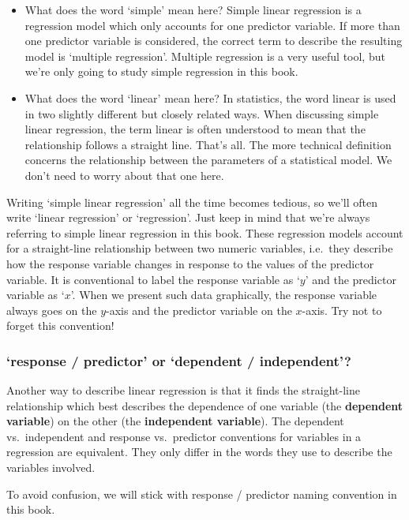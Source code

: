 \documentclass[
]{book}
\newenvironment{greybox}{
  \definecolor{shadecolor}{rgb}{0.95,0.95,0.95}  %
  \color{black}
  \begin{shaded}}
 {\end{shaded}}
\newenvironment{infobox}[1]
  {
  \begin{itemize}
  \renewcommand{\labelitemi}{
    \raisebox{-.7\height}[0pt][0pt]{
      {\setkeys{Gin}{width=3em,keepaspectratio}
        \texttt{[image: images/\#1]}}
    }
  }
  \setlength{\fboxsep}{1em}
  \begin{greybox}
  \item
  }
  {
  \end{greybox}
  \end{itemize}
  }
\begin{document}
\begin{itemize}
\item
  What does the word `simple' mean here? Simple linear regression is a regression model which only accounts for one predictor variable. If more than one predictor variable is considered, the correct term to describe the resulting model is `multiple regression'. Multiple regression is a very useful tool, but we're only going to study simple regression in this book.
\item
  What does the word `linear' mean here? In statistics, the word linear is used in two slightly different but closely related ways. When discussing simple linear regression, the term linear is often understood to mean that the relationship follows a straight line. That's all. The more technical definition concerns the relationship between the parameters of a statistical model. We don't need to worry about that one here.
\end{itemize}

Writing `simple linear regression' all the time becomes tedious, so we'll often write `linear regression' or `regression'. Just keep in mind that we're always referring to simple linear regression in this book. These regression models account for a straight-line relationship between two numeric variables, i.e.~they describe how the response variable changes in response to the values of the predictor variable. It is conventional to label the response variable as `\(y\)' and the predictor variable as `\(x\)'. When we present such data graphically, the response variable always goes on the \(y\)-axis and the predictor variable on the \(x\)-axis. Try not to forget this convention!

\begin{infobox}{information}

\hypertarget{response-predictor-or-dependent-independent}{%
\subsubsection*{`response / predictor' or `dependent / independent'?}\label{response-predictor-or-dependent-independent}}

Another way to describe linear regression is that it finds the straight-line relationship which best describes the dependence of one variable (the \textbf{dependent variable}) on the other (the \textbf{independent variable}). The dependent vs.~independent and response vs.~predictor conventions for variables in a regression are equivalent. They only differ in the words they use to describe the variables involved.

To avoid confusion, we will stick with response / predictor naming convention in this book.

\end{infobox}
\end{document}
